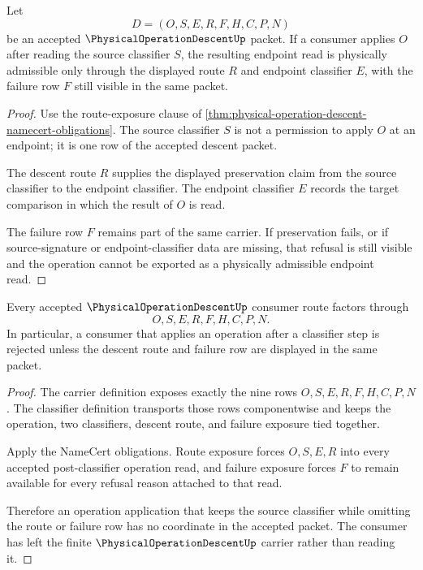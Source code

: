 \begin{theorem}
\label{thm:physical-operation-descent-signature-preservation}
Let
$$
D=(O,S,E,R,F,H,C,P,N)
$$
be an accepted $\PhysicalOperationDescentUp$ packet. If a consumer applies $O$ after reading the source classifier $S$, the resulting endpoint read is physically admissible only through the displayed route $R$ and endpoint classifier $E$, with the failure row $F$ still visible in the same packet.
\end{theorem}
\begin{proof}
Use the route-exposure clause of \autoref{thm:physical-operation-descent-namecert-obligations}. The source classifier $S$ is not a permission to apply $O$ at an endpoint; it is one row of the accepted descent packet.

The descent route $R$ supplies the displayed preservation claim from the source classifier to the endpoint classifier. The endpoint classifier $E$ records the target comparison in which the result of $O$ is read.

The failure row $F$ remains part of the same carrier. If preservation fails, or if source-signature or endpoint-classifier data are missing, that refusal is still visible and the operation cannot be exported as a physically admissible endpoint read.
\end{proof}

\begin{theorem}
\label{thm:physical-operation-descent-ledger-nonescape}
Every accepted $\PhysicalOperationDescentUp$ consumer route factors through
$$
O,S,E,R,F,H,C,P,N.
$$
In particular, a consumer that applies an operation after a classifier step is rejected unless the descent route and failure row are displayed in the same packet.
\end{theorem}
\begin{proof}
The carrier definition exposes exactly the nine rows $O,S,E,R,F,H,C,P,N$. The classifier definition transports those rows componentwise and keeps the operation, two classifiers, descent route, and failure exposure tied together.

Apply the NameCert obligations. Route exposure forces $O,S,E,R$ into every accepted post-classifier operation read, and failure exposure forces $F$ to remain available for every refusal reason attached to that read.

Therefore an operation application that keeps the source classifier while omitting the route or failure row has no coordinate in the accepted packet. The consumer has left the finite $\PhysicalOperationDescentUp$ carrier rather than reading it.
\end{proof}

